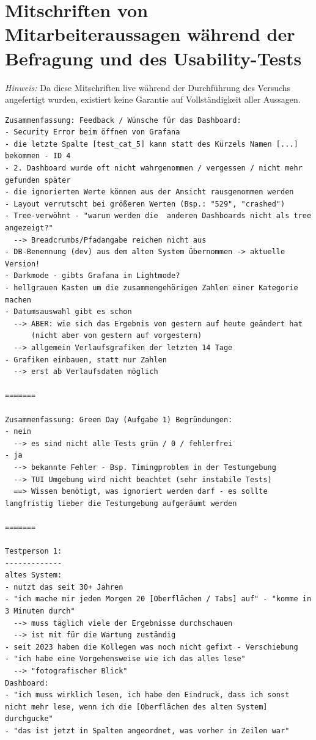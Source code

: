 \chapter{Mitschriften von Mitarbeiteraussagen während der Befragung und des Usability-Tests}
\label{Add:Mitschriften_Mitarbeiteraussagen}

\textit{Hinweis:} Da diese Mitschriften live während der Durchführung des Versuchs angefertigt wurden, existiert keine Garantie auf Vollständigkeit aller Aussagen.


\begin{lstlisting}[language={[LaTeX]TeX},inputencoding={utf8}]
Zusammenfassung: Feedback / Wünsche für das Dashboard:
- Security Error beim öffnen von Grafana
- die letzte Spalte [test_cat_5] kann statt des Kürzels Namen [...] bekommen - ID 4
- 2. Dashboard wurde oft nicht wahrgenommen / vergessen / nicht mehr gefunden später
- die ignorierten Werte können aus der Ansicht rausgenommen werden
- Layout verrutscht bei größeren Werten (Bsp.: "529", "crashed")
- Tree-verwöhnt - "warum werden die  anderen Dashboards nicht als tree angezeigt?"
  --> Breadcrumbs/Pfadangabe reichen nicht aus
- DB-Benennung (dev) aus dem alten System übernommen -> aktuelle Version!
- Darkmode - gibts Grafana im Lightmode?
- hellgrauen Kasten um die zusammengehörigen Zahlen einer Kategorie machen
- Datumsauswahl gibt es schon
  --> ABER: wie sich das Ergebnis von gestern auf heute geändert hat
      (nicht aber von gestern auf vorgestern)
  --> allgemein Verlaufsgrafiken der letzten 14 Tage
- Grafiken einbauen, statt nur Zahlen
  --> erst ab Verlaufsdaten möglich

=======

Zusammenfassung: Green Day (Aufgabe 1) Begründungen:
- nein
  --> es sind nicht alle Tests grün / 0 / fehlerfrei
- ja
  --> bekannte Fehler - Bsp. Timingproblem in der Testumgebung
  --> TUI Umgebung wird nicht beachtet (sehr instabile Tests)
  ==> Wissen benötigt, was ignoriert werden darf - es sollte langfristig lieber die Testumgebung aufgeräumt werden

=======

Testperson 1:
-------------
altes System:
- nutzt das seit 30+ Jahren
- "ich mache mir jeden Morgen 20 [Oberflächen / Tabs] auf" - "komme in 3 Minuten durch"
  --> muss täglich viele der Ergebnisse durchschauen
  --> ist mit für die Wartung zuständig
- seit 2023 haben die Kollegen was noch nicht gefixt - Verschiebung
- "ich habe eine Vorgehensweise wie ich das alles lese"
  --> "fotografischer Blick"
Dashboard:
- "ich muss wirklich lesen, ich habe den Eindruck, dass ich sonst nicht mehr lese, wenn ich die [Oberflächen des alten System] durchgucke"
- "das ist jetzt in Spalten angeordnet, was vorher in Zeilen war"


\end{lstlisting}

